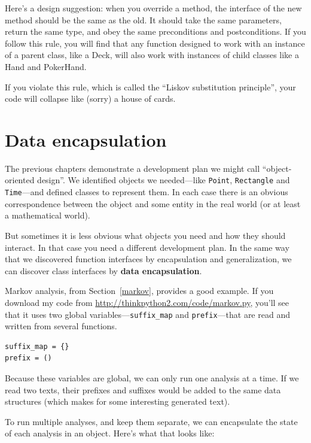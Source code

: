 \documentclass[10pt]{book}
\begin{document}
Here's a design suggestion: when you override a method,
the interface of the new method should be the same as the old.  It
should take the same parameters, return the same type, and obey the
same preconditions and postconditions.  If you follow this rule, you
will find that any function designed to work with an instance of a
parent class, like a Deck, will also work with instances of child
classes like a Hand and PokerHand.

If you violate this rule, which is called the ``Liskov substitution
principle'', your code will collapse like (sorry) a house of cards.


\section{Data encapsulation}

The previous chapters demonstrate a development plan we might call
``object-oriented design''.  We identified objects we needed---like
{\tt Point}, {\tt Rectangle} and {\tt Time}---and defined classes to
represent them.  In each case there is an obvious correspondence
between the object and some entity in the real world (or at least a
mathematical world).

But sometimes it is less obvious what objects you need
and how they should interact.  In that case you need a different
development plan.  In the same way that we discovered function
interfaces by encapsulation and generalization, we can discover
class interfaces by {\bf data encapsulation}.

Markov analysis, from Section~\ref{markov}, provides a good example.
If you download my code from \url{http://thinkpython2.com/code/markov.py},
you'll see that it uses two global variables---\verb"suffix_map" and
\verb"prefix"---that are read and written from several functions.

\begin{verbatim}
suffix_map = {}
prefix = ()
\end{verbatim}

Because these variables are global, we can only run one analysis at a
time.  If we read two texts, their prefixes and suffixes would be
added to the same data structures (which makes for some interesting
generated text).

To run multiple analyses, and keep them separate, we can encapsulate
the state of each analysis in an object.
Here's what that looks like:
\end{document}
